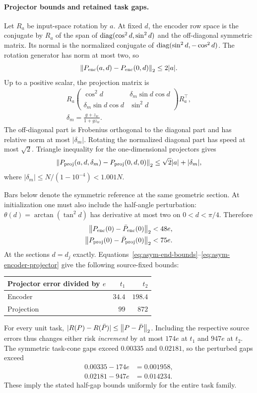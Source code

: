 \paragraph{Projector bounds and retained task gaps.}
Let $R_a$ be input-space rotation by $a$. At fixed $d$, the encoder row space is the conjugate by $R_a$ of the span of $\operatorname{diag}(\cos^2d,\sin^2d)$ and the off-diagonal symmetric matrix. Its normal is the normalized conjugate of $\operatorname{diag}(\sin^2d,-\cos^2d)$. The rotation generator has norm at most two, so
\begin{equation}
 \left\lVert P_{\rm enc}(a,d)-P_{\rm enc}(0,d)\right\rVert_2\le2|a|.
 \label{eq:asym-encoder-projector}
\end{equation}
Up to a positive scalar, the projection matrix is
\begin{gather}
 R_a\begin{pmatrix}
 \cos^2d&\delta_m\sin d\cos d\\
 \delta_m\sin d\cos d&\sin^2d
 \end{pmatrix}R_a^\top,\\
 \delta_m=\frac{g+z_w}{1+gz_w}.
\end{gather}
The off-diagonal part is Frobenius orthogonal to the diagonal part and has relative norm at most $|\delta_m|$. Rotating the normalized diagonal part has speed at most $\sqrt2$. Triangle inequality for the one-dimensional projectors gives
\begin{equation}
 \left\lVert P_{\rm proj}(a,d,\delta_m)-P_{\rm proj}(0,d,0)\right\rVert_2
 \le\sqrt2|a|+|\delta_m|,
\end{equation}
where $|\delta_m|\le N/(1-10^{-4})<1.001N$.

Bars below denote the symmetric reference at the same geometric section. At initialization one must also include the half-angle perturbation: $\theta(d)=\arctan(\tan^2d)$ has derivative at most two on $0<d<\pi/4$. Therefore
\begin{align}
 \left\lVert P_{\rm enc}(0)-\bar P_{\rm enc}(0)\right\rVert_2&<48e,\\
 \left\lVert P_{\rm proj}(0)-\bar P_{\rm proj}(0)\right\rVert_2&<75e.
\end{align}
At the sections $d=d_j$ exactly. Equations~\eqref{eq:asym-end-bounds}--\eqref{eq:asym-encoder-projector} give the following source-fixed bounds:
\begin{center}
\begin{tabular}{lrr}
\toprule
Projector error divided by $e$&$t_1$&$t_2$\\\midrule
Encoder&$34.4$&$198.4$\\
Projection&$99$&$872$\\\bottomrule
\end{tabular}
\end{center}
For every unit task, $|R(P)-R(\bar P)|\le\left\lVert P-\bar P\right\rVert_2$. Including the respective source errors thus changes either risk \emph{increment} by at most $174e$ at $t_1$ and $947e$ at $t_2$. The symmetric task-cone gaps exceed $0.00335$ and $0.02181$, so the perturbed gaps exceed
\begin{align}
 0.00335-174e&=0.001958,\\
 0.02181-947e&=0.014234.
\end{align}
These imply the stated half-gap bounds uniformly for the entire task family.

